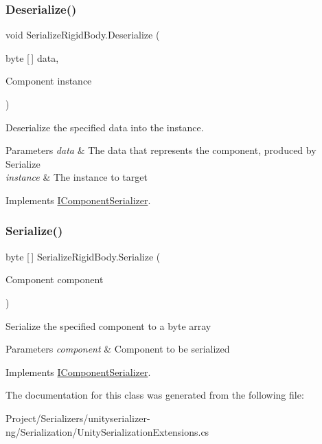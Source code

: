 \subsubsection{\texorpdfstring{Deserialize()}{Deserialize()}}
{\footnotesize\ttfamily void Serialize\+Rigid\+Body.\+Deserialize (\begin{DoxyParamCaption}\item[{byte \mbox{[}$\,$\mbox{]}}]{data,  }\item[{Component}]{instance }\end{DoxyParamCaption})\hspace{0.3cm}{\ttfamily [inline]}}



Deserialize the specified data into the instance. 


\begin{DoxyParams}{Parameters}
{\em data} & The data that represents the component, produced by Serialize \\
\hline
{\em instance} & The instance to target \\
\hline
\end{DoxyParams}


Implements \hyperlink{interface_i_component_serializer_a4cc366a5c78b33d47a90c209d8fed883}{I\+Component\+Serializer}.

\mbox{\label{class_serialize_rigid_body_a5b70b8af5b0b775bc961eb553a36b438}} 
\subsubsection{\texorpdfstring{Serialize()}{Serialize()}}
{\footnotesize\ttfamily byte \mbox{[}$\,$\mbox{]} Serialize\+Rigid\+Body.\+Serialize (\begin{DoxyParamCaption}\item[{Component}]{component }\end{DoxyParamCaption})\hspace{0.3cm}{\ttfamily [inline]}}



Serialize the specified component to a byte array 


\begin{DoxyParams}{Parameters}
{\em component} & Component to be serialized \\
\hline
\end{DoxyParams}


Implements \hyperlink{interface_i_component_serializer_ab2aa38005665496b62d6c54b5f0dbd31}{I\+Component\+Serializer}.



The documentation for this class was generated from the following file\+:\begin{DoxyCompactItemize}
\item 
Project/\+Serializers/unityserializer-\/ng/\+Serialization/Unity\+Serialization\+Extensions.\+cs\end{DoxyCompactItemize}
